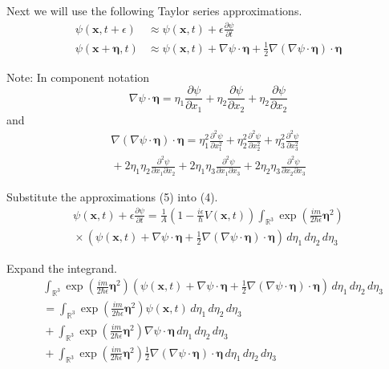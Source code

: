 \documentclass[12pt]{article}
\begin{document}
Next we will use the following Taylor series approximations.
\begin{equation*}
\begin{aligned}
\psi(\mathbf x,t+\epsilon)&\approx\psi(\mathbf x,t)+\epsilon\frac{\partial\psi}{\partial t}
\\
\psi(\mathbf x+\boldsymbol\eta,t)&\approx\psi(\mathbf x,t)+\nabla\psi\cdot\boldsymbol\eta
+\tfrac{1}{2}\nabla(\nabla\psi\cdot\boldsymbol\eta)\cdot\boldsymbol\eta
\end{aligned}
\tag{5}
\end{equation*}

Note: In component notation
\begin{equation*}
\nabla\psi\cdot\boldsymbol\eta=
\eta_1\frac{\partial\psi}{\partial x_1}+
\eta_2\frac{\partial\psi}{\partial x_2}+
\eta_2\frac{\partial\psi}{\partial x_2}
\end{equation*}
and
\begin{multline*}
\nabla(\nabla\psi\cdot\boldsymbol\eta)\cdot\boldsymbol\eta=
\eta_1^2\frac{\partial^2\psi}{\partial x_1^2}
+\eta_2^2\frac{\partial^2\psi}{\partial x_2^2}
+\eta_3^2\frac{\partial^2\psi}{\partial x_3^2}
\\
{}+2\eta_1\eta_2\frac{\partial^2\psi}{\partial x_1\partial x_2}
+2\eta_1\eta_3\frac{\partial^2\psi}{\partial x_1\partial x_3}
+2\eta_2\eta_3\frac{\partial^2\psi}{\partial x_2\partial x_3}
\end{multline*}

Substitute the approximations (5) into (4).
\begin{multline*}
\psi(\mathbf{x},t)+\epsilon\frac{\partial\psi}{\partial t}=
\frac{1}{A}
\left(1-\frac{i\epsilon}{\hbar}V\left(\mathbf x,t\right)\right)
\int_{\mathbb R^3}
\exp\left(\frac{im}{2\hbar\epsilon}\boldsymbol\eta^2\right)
\\
{}\times\left(
\psi(\mathbf x,t)
+\nabla\psi\cdot\boldsymbol\eta
+\tfrac{1}{2}\nabla(\nabla\psi\cdot\boldsymbol\eta)\cdot\boldsymbol\eta
\right)\,d\eta_1\,d\eta_2\,d\eta_3
\tag{6}
\end{multline*}

Expand the integrand.
\begin{align*}
&\int_{\mathbb R^3}
\exp\left(\frac{im}{2\hbar\epsilon}\boldsymbol\eta^2\right)
\left(
\psi(\mathbf x,t)
+\nabla\psi\cdot\boldsymbol\eta
+\tfrac{1}{2}\nabla(\nabla\psi\cdot\boldsymbol\eta)\cdot\boldsymbol\eta
\right)\,d\eta_1\,d\eta_2\,d\eta_3
\\
&{}=\int_{\mathbb R^3}
\exp\left(\frac{im}{2\hbar\epsilon}\boldsymbol\eta^2\right)
\psi(\mathbf x,t)
\,d\eta_1\,d\eta_2\,d\eta_3
\tag{7}
\\
&{}+\int_{\mathbb R^3}
\exp\left(\frac{im}{2\hbar\epsilon}\boldsymbol\eta^2\right)
\nabla\psi\cdot\boldsymbol\eta
\,d\eta_1\,d\eta_2\,d\eta_3
\tag{8}
\\
&{}+\int_{\mathbb R^3}
\exp\left(\frac{im}{2\hbar\epsilon}\boldsymbol\eta^2\right)
\tfrac{1}{2}
\nabla(\nabla\psi\cdot\boldsymbol\eta)\cdot\boldsymbol\eta
\,d\eta_1\,d\eta_2\,d\eta_3
\tag{9}
\end{align*}
\end{document}
